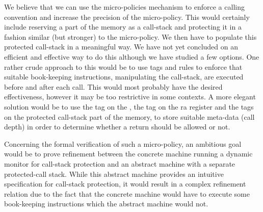 We believe that we can use the micro-policies mechanism to enforce a
calling convention and increase the precision of the \CFI
micro-policy. This would certainly include reserving a part of the
memory as a call-stack and protecting it in a fashion similar (but
stronger) to the \NWC micro-policy. We then have to populate this
protected call-stack in a meaningful way. We have not yet concluded on
an efficient and effective way to do this although we have studied a
few options. One rather crude approach to this would be to use tags
and rules to enforce that suitable book-keeping instructions,
manipulating the call-stack, are executed before and after each
call. This would most probably have the desired effectiveness, however
it may be too restrictive in some contexts. A more elegant solution
would be to use the tag on the \pc, the tag on the ra register and the
tags on the protected call-stack part of the memory, to store suitable
meta-data (\EG call depth) in order to determine whether a return
should be allowed or not.

Concerning the formal verification of such a micro-policy, an
ambitious goal would be to prove refinement between the concrete
machine running a dynamic monitor for call-stack protection and an
abstract machine with a separate protected-call stack. While this
abstract machine provides an intuitive specification for call-stack
protection, it would result in a complex refinement relation due to
the fact that the concrete machine would have to execute some
book-keeping instructions which the abstract machine would not.




